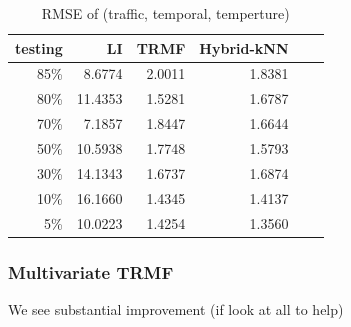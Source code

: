 \begin{table} [htbp]
\centering
\caption{RMSE of (traffic, temporal, temperture)}
\label{table:traffic_temporal_tem}
\begin{tabular}{ r | r r r r r}
	testing	&LI	&TRMF	&Hybrid-kNN \\ \hline
	85\%	& 8.6774	&2.0011	&1.8381\\ 
	80\%	&11.4353	&1.5281	&1.6787\\
	70\%	& 7.1857	&1.8447	&1.6644\\
	50\%	&10.5938	&1.7748	&1.5793\\
	30\%	&14.1343	&1.6737	&1.6874\\
	10\%	&16.1660	&1.4345	&1.4137\\
	 5\%	&10.0223	&1.4254	&1.3560
\end{tabular}
\end{table}

\subsubsection{Multivariate TRMF}
We see substantial improvement (if look at all to help) 

